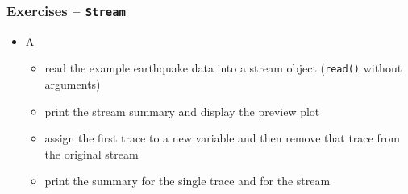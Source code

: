 \documentclass[t,10pt,compress=false,usepdftitle=false]{beamer}
\begin{document}
\begin{frame}[fragile]
    \frametitle{Exercises -- \tt{Stream}}
    \begin{itemize}
    \item A
        \begin{itemize}
        \item read the example earthquake data into a stream object (\verb#read()# without arguments)
        \item print the stream summary and display the preview plot
        \item assign the first trace to a new variable and then remove that trace from the original stream
        \item print the summary for the single trace and for the stream
        \end{itemize}
    \end{itemize}
\end{frame}
\end{document}
